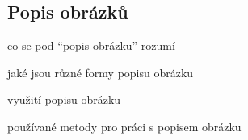 \subsection{Popis obrázků}
{\color{blue}co se pod \enquote{popis obrázku} rozumí}

{\color{blue}jaké jsou různé formy popisu obrázku}

{\color{blue}využití popisu obrázku}

{\color{blue}používané metody pro práci s popisem obrázku}
